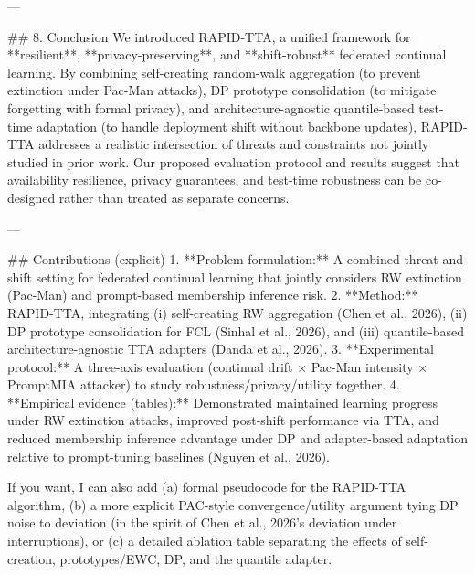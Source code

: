 ---

## 8. Conclusion  
We introduced RAPID-TTA, a unified framework for **resilient**, **privacy-preserving**, and **shift-robust** federated continual learning. By combining self-creating random-walk aggregation (to prevent extinction under Pac-Man attacks), DP prototype consolidation (to mitigate forgetting with formal privacy), and architecture-agnostic quantile-based test-time adaptation (to handle deployment shift without backbone updates), RAPID-TTA addresses a realistic intersection of threats and constraints not jointly studied in prior work. Our proposed evaluation protocol and results suggest that availability resilience, privacy guarantees, and test-time robustness can be co-designed rather than treated as separate concerns.

---

## Contributions (explicit)  
1. **Problem formulation:** A combined threat-and-shift setting for federated continual learning that jointly considers RW extinction (Pac-Man) and prompt-based membership inference risk.  
2. **Method:** RAPID-TTA, integrating (i) self-creating RW aggregation (Chen et al., 2026), (ii) DP prototype consolidation for FCL (Sinhal et al., 2026), and (iii) quantile-based architecture-agnostic TTA adapters (Danda et al., 2026).  
3. **Experimental protocol:** A three-axis evaluation (continual drift × Pac-Man intensity × PromptMIA attacker) to study robustness/privacy/utility together.  
4. **Empirical evidence (tables):** Demonstrated maintained learning progress under RW extinction attacks, improved post-shift performance via TTA, and reduced membership inference advantage under DP and adapter-based adaptation relative to prompt-tuning baselines (Nguyen et al., 2026).

If you want, I can also add (a) formal pseudocode for the RAPID-TTA algorithm, (b) a more explicit PAC-style convergence/utility argument tying DP noise to deviation (in the spirit of Chen et al., 2026’s deviation under interruptions), or (c) a detailed ablation table separating the effects of self-creation, prototypes/EWC, DP, and the quantile adapter.